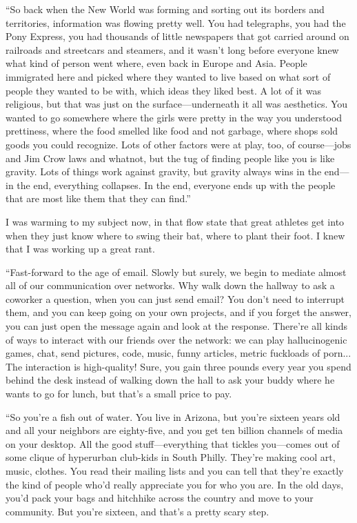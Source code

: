 “So back when the New World was forming and sorting out its borders
and territories, information was flowing pretty well. You had
telegraphs, you had the Pony Express, you had thousands of little
newspapers that got carried around on railroads and streetcars and
steamers, and it wasn’t long before everyone knew what kind of
person went where, even back in Europe and Asia. People immigrated
here and picked where they wanted to live based on what sort of
people they wanted to be with, which ideas they liked best. A lot
of it was religious, but that was just on the surface—underneath it
all was aesthetics. You wanted to go somewhere where the girls were
pretty in the way you understood prettiness, where the food smelled
like food and not garbage, where shops sold goods you could
recognize. Lots of other factors were at play, too, of course—jobs
and Jim Crow laws and whatnot, but the tug of finding people like
you is like gravity. Lots of things work against gravity, but
gravity always wins in the end—in the end, everything collapses. In
the end, everyone ends up with the people that are most like them
that they can find.”

I was warming to my subject now, in that flow state that great
athletes get into when they just know where to swing their bat,
where to plant their foot. I knew that I was working up a great
rant.

“Fast-forward to the age of email. Slowly but surely, we begin to
mediate almost all of our communication over networks. Why walk
down the hallway to ask a coworker a question, when you can just
send email? You don’t need to interrupt them, and you can keep
going on your own projects, and if you forget the answer, you can
just open the message again and look at the response. There’re all
kinds of ways to interact with our friends over the network: we can
play hallucinogenic games, chat, send pictures, code, music, funny
articles, metric fuckloads of porn... The interaction is
high-quality! Sure, you gain three pounds every year you spend
behind the desk instead of walking down the hall to ask your buddy
where he wants to go for lunch, but that’s a small price to pay.

“So you’re a fish out of water. You live in Arizona, but you’re
sixteen years old and all your neighbors are eighty-five, and you
get ten billion channels of media on your desktop. All the good
stuff—everything that tickles you—comes out of some clique of
hyperurban club-kids in South Philly. They’re making cool art,
music, clothes. You read their mailing lists and you can tell that
they’re exactly the kind of people who’d really appreciate you for
who you are. In the old days, you’d pack your bags and hitchhike
across the country and move to your community. But you’re sixteen,
and that’s a pretty scary step.

